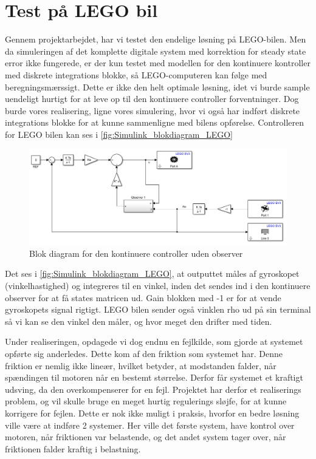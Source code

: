 \section{Test på LEGO bil}

Gennem projektarbejdet, har vi testet den endelige løsning på LEGO-bilen. Men da simuleringen af det komplette digitale system med korrektion for steady state error ikke fungerede, er der kun testet med modellen for den kontinuere kontroller  med diskrete integrations blokke, så LEGO-computeren kan følge med beregningsmærssigt. Dette er ikke den helt optimale løsning, idet vi burde sample uendeligt hurtigt for at leve op til den kontinuere controller forventninger. Dog burde vores realisering, ligne vores simulering, hvor vi også har indført diskrete integrations blokke for at kunne sammenligne med bilens opførelse. Controlleren for LEGO bilen kan ses i \autoref{fig:Simulink_blokdiagram_LEGO} 

\begin{figure}[H]
	\centering
	\includegraphics[width = 1\textwidth]{figur/Simulink_blokdiagram_LEGO}
	\caption{Blok diagram for den kontinuere controller uden observer}
	\label{fig:Simulink_blokdiagram_LEGO}
\end{figure}

Det ses i \autoref{fig:Simulink_blokdiagram_LEGO}, at outputtet måles af gyroskopet (vinkelhastighed) og integreres til en vinkel, inden det sendes ind i den kontinuere observer for at få states matricen ud. Gain blokken med -1 er for at vende gyroskopets signal rigtigt. LEGO bilen sender også vinklen rho ud på sin terminal så vi kan se den vinkel den måler, og hvor meget den drifter med tiden.

Under realiseringen, opdagede vi dog endnu en fejlkilde, som gjorde at systemet opførte sig anderledes. Dette kom af den friktion som systemet har. Denne friktion er nemlig ikke lineær, hvilket betyder, at modstanden falder, når spændingen til motoren når en bestemt størrelse. Derfor får systemet et kraftigt udsving, da den overkompenserer for en fejl. Projektet har derfor et realiserings problem, og vil skulle bruge en meget hurtig regulerings sløjfe, for at kunne korrigere for fejlen. Dette er nok ikke muligt i praksis, hvorfor en bedre løsning ville være at indføre 2 systemer. Her ville det første system, have kontrol over motoren, når friktionen var belastende, og det andet system tager over, når friktionen falder kraftig i belastning.

